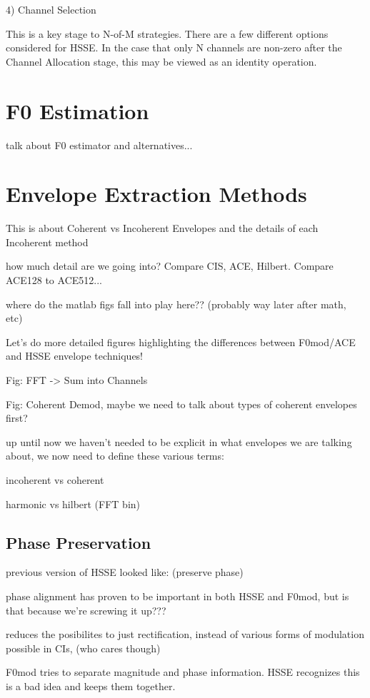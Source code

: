\documentclass [11pt, proquest] {uwthesis}[2015/03/03]
\begin{document}
4) Channel Selection

This is a key stage to N-of-M strategies.  There are a few different options considered for HSSE.  In the case that only N channels are non-zero after the Channel Allocation stage, this may be viewed as an identity operation.

\section{F0 Estimation}

talk about F0 estimator and alternatives...

\section{Envelope Extraction Methods}

This is about Coherent vs Incoherent Envelopes and the details of each Incoherent method

how much detail are we going into?  Compare CIS, ACE, Hilbert.  Compare ACE128 to ACE512...

where do the matlab figs fall into play here?? (probably way later after math, etc)

Let's do more detailed figures highlighting the differences between F0mod/ACE and HSSE envelope techniques!

Fig: FFT -> Sum into Channels

Fig: Coherent Demod, maybe we need to talk about types of coherent envelopes first?

up until now we haven't needed to be explicit in what envelopes we are talking about, we now need to define these various terms:

incoherent vs coherent

harmonic vs hilbert (FFT bin)


\subsection{Phase Preservation}

previous version of HSSE looked like: (preserve phase)

phase alignment has proven to be important in both HSSE and F0mod, but is that because we're screwing it up???

reduces the posibilites to just rectification, instead of various forms of modulation possible in CIs, (who cares though)

F0mod tries to separate magnitude and phase information.  HSSE recognizes this is a bad idea and keeps them together.
\end{document}
